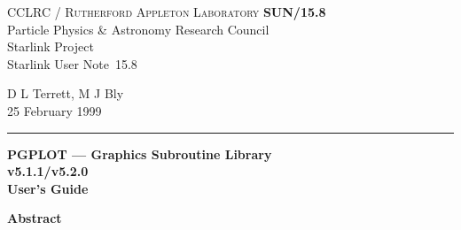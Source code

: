 \documentclass[twoside,11pt]{article}
\newcommand{\stardoccategory}  {Starlink User Note}
\newcommand{\stardocinitials}  {SUN}
\newcommand{\stardocnumber}    {15.8}
\newcommand{\stardocauthors}   {D L Terrett, M J Bly}
\newcommand{\stardocdate}      {25 February 1999}
\newcommand{\stardoctitle}     {PGPLOT --- Graphics Subroutine Library}
\newcommand{\stardocversion}   {v5.1.1/v5.2.0}
\newcommand{\stardocmanual}    {User's Guide}
\newcommand{\stardocname}{\stardocinitials /\stardocnumber}
\newenvironment{latexonly}{}{}
\renewcommand{\_}{\texttt{\symbol{95}}}
\begin{document}
\thispagestyle{empty}

\begin{latexonly}
   CCLRC / \textsc{Rutherford Appleton Laboratory} \hfill \textbf{\stardocname}\\
   {\large Particle Physics \& Astronomy Research Council}\\
   {\large Starlink Project\\}
   {\large \stardoccategory\ \stardocnumber}
   \begin{flushright}
   \stardocauthors\\
   \stardocdate
   \end{flushright}
   \vspace{-4mm}
   \rule{\textwidth}{0.5mm}
   \vspace{5mm}
   \begin{center}
   {\Huge\textbf{\stardoctitle \\ [2.5ex]}}
   {\LARGE\textbf{\stardocversion \\ [4ex]}}
   {\Huge\textbf{\stardocmanual}}
   \end{center}
   \vspace{5mm}


   \vspace{10mm}
   \begin{center}
      {\Large\textbf{Abstract}}
   \end{center}
\end{latexonly}
\end{document}
